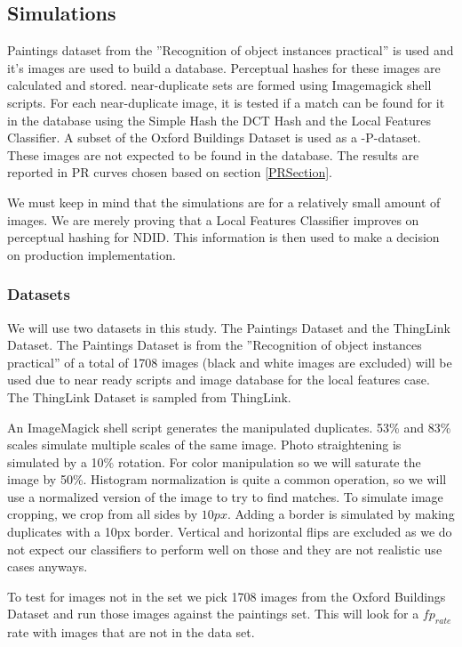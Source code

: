 \documentclass[english,12pt,a4paper,pdftex,elec,utf8, table]{aaltothesis}
\begin{document}
\subsection{Simulations}
Paintings dataset from the ''Recognition of object instances practical'' \cite{Vedaldi2012} is used and it's images are used to build a database. Perceptual hashes for these images are calculated and stored. near-duplicate sets are formed using Imagemagick shell scripts. For each near-duplicate image, it is tested if a match can be found for it in the database using the Simple Hash the DCT Hash and the Local Features Classifier. A subset of the Oxford Buildings Dataset \cite{PhilbinJamesArandjelovicReljaZisserman2012} is used as a -P-dataset. These images are not expected to be found in the database. The results are reported in PR curves chosen based on section \ref{PRSection}.

We must keep in mind that the simulations are for a relatively small amount of images. We are merely proving that a Local Features Classifier improves on perceptual hashing for NDID. This information is then used to make a decision on production implementation.

\subsubsection{Datasets}
We will use two datasets in this study. The Paintings Dataset and the ThingLink Dataset. The Paintings Dataset is from the ''Recognition of object instances practical'' \cite{Vedaldi2012} of a total of 1708 images (black and white images are excluded) will be used due to near ready scripts and image database for the local features case. The ThingLink Dataset is sampled from ThingLink.

An ImageMagick shell script generates the manipulated duplicates. 53\% and 83\% scales simulate multiple scales of the same image. Photo straightening is simulated by a 10\% rotation. For color manipulation so we will saturate the image by 50\%. Histogram normalization is quite a common operation, so we will use a normalized version of the image to try to find matches. To simulate image cropping, we crop from all sides by $10px$. Adding a border is simulated by making duplicates with a 10px border. Vertical and horizontal flips are excluded as we do not expect our classifiers to perform well on those and they are not realistic use cases anyways.

To test for images not in the set we pick 1708 images from the Oxford Buildings Dataset \cite{PhilbinJamesArandjelovicReljaZisserman2012} and run those images against the paintings set. This will look for a $fp_{rate}$ rate with images that are not in the data set.
\end{document}
